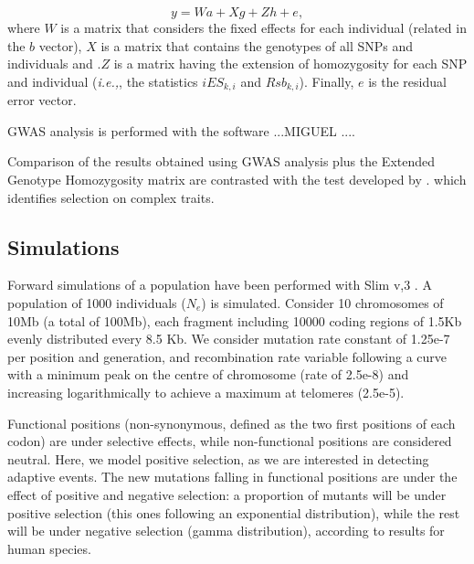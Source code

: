 \documentclass[a4paper,11pt]{article}
\begin{document}
\begin{equation}
y = Wa + Xg + Zh + e ,
\end{equation}
where $W$ is a matrix that considers the fixed effects for each individual (related in the $b$ vector), $X$ is a matrix that contains the genotypes of all SNPs and individuals and .$Z$ is a matrix having the extension of homozygosity for each SNP and individual (\textit{i.e.,}, the statistics $iES_{k,i}$ and $Rsb_{k,i}$). Finally, $e$ is the residual error vector. 

\noindent GWAS analysis is performed with the software ...MIGUEL ....\par

\noindent Comparison of the results obtained using GWAS analysis plus the Extended Genotype Homozygosity matrix are contrasted with the test developed by \citet{Beissinger:2018aa}. which identifies selection on complex traits. \par

\subsection{Simulations}

Forward simulations of a population have been performed with Slim v,3 \citep{Haller:2019aa}. A population of 1000 individuals ($N_e$) is simulated. Consider 10 chromosomes of 10Mb (a total of 100Mb), each fragment including 10000 coding regions of 1.5Kb evenly distributed every 8.5 Kb. We consider mutation rate constant of 1.25e-7 per position and generation, and recombination rate variable following a curve with a minimum peak on the centre of chromosome (rate of 2.5e-8) and increasing logarithmically to achieve a maximum at telomeres (2.5e-5).

Functional positions (non-synonymous, defined as the two first positions of each codon) are under selective effects, while non-functional positions are considered neutral. Here, we model positive selection, as we are interested in detecting adaptive events. The new mutations falling in functional positions are under the effect of positive and negative selection: a proportion of mutants will be under positive selection (this ones following an exponential distribution), while the rest will be under negative selection (gamma distribution), according to \citep{Boyko:2008aa} results for human species. 
\end{document}
